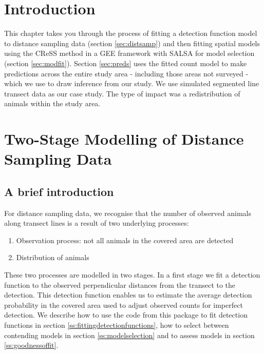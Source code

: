 
\label{cha:off}
\section{Introduction}

This chapter takes you through the process of fitting a detection function model to distance sampling data (section \ref{sec:distsamp}) and then fitting spatial models using the CReSS method in a GEE framework with SALSA for model selection (section \ref{sec:modfit}).  Section \ref{sec:preds} uses the fitted count model to make predictions across the entire study area - including those areas not surveyed - which we use to draw inference from our study. We use simulated segmented line transect data as our case study. The type of impact was a redistribution of animals within the study area. 
\section{Two-Stage Modelling of Distance Sampling Data}

\subsection{A brief introduction}
For distance sampling data, we recognise that the number of observed animals along transect lines is a result of two underlying processes: 
\begin{enumerate}
\item{Observation process: not all animals in the covered area are detected}
\item{Distribution of animals}
\end{enumerate}

\noindent These two processes are modelled in two stages. In a first stage we fit a detection function to the observed perpendicular distances from the transect to the detection. This detection function enables us to estimate the average detection probability in the covered area used to adjust observed counts for imperfect detection. We describe how to use the code from this package to fit detection functions in section \ref{ss:fittingdetectionfunctions}, how to select between contending models in section \ref{ss:modelselection} and to assess models in section \ref{ss:goodnessoffit}. \\

